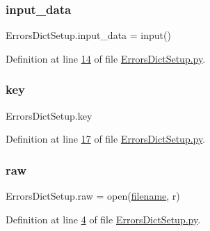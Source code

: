 \mbox{\label{namespace_errors_dict_setup_a82a4de99ebada6605cb7ca0598ef411e}} 
\subsubsection{\texorpdfstring{input\+\_\+data}{input\_data}}
{\footnotesize\ttfamily Errors\+Dict\+Setup.\+input\+\_\+data = input()}



Definition at line \mbox{\hyperlink{_errors_dict_setup_8py_source_l00014}{14}} of file \mbox{\hyperlink{_errors_dict_setup_8py_source}{Errors\+Dict\+Setup.\+py}}.

\mbox{\label{namespace_errors_dict_setup_a09c268098d09ffb8e5504f30fa6d5dd9}} 
\subsubsection{\texorpdfstring{key}{key}}
{\footnotesize\ttfamily Errors\+Dict\+Setup.\+key}



Definition at line \mbox{\hyperlink{_errors_dict_setup_8py_source_l00017}{17}} of file \mbox{\hyperlink{_errors_dict_setup_8py_source}{Errors\+Dict\+Setup.\+py}}.

\mbox{\label{namespace_errors_dict_setup_a71f324cc110ab41d2a588f590fff7481}} 
\subsubsection{\texorpdfstring{raw}{raw}}
{\footnotesize\ttfamily Errors\+Dict\+Setup.\+raw = open(\mbox{\hyperlink{namespace_errors_dict_setup_a0c97c48fca0fdec3e730b9df1dbab9c7}{filename}}, \textquotesingle{}r\textquotesingle{})}



Definition at line \mbox{\hyperlink{_errors_dict_setup_8py_source_l00004}{4}} of file \mbox{\hyperlink{_errors_dict_setup_8py_source}{Errors\+Dict\+Setup.\+py}}.

